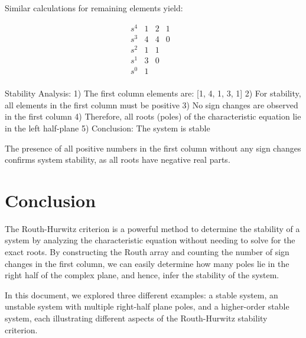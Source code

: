 \documentclass[a4paper,12pt]{article}
\begin{document}
Similar calculations for remaining elements yield:

$$
\begin{array}{c|cccc}
s^4 & 1 & 2 & 1 & \\
s^3 & 4 & 4 & 0 & \\
s^2 & 1 & 1 & & \\
s^1 & 3 & 0 & & \\
s^0 & 1 & & & \\
\end{array}
$$

Stability Analysis:
1) The first column elements are: [1, 4, 1, 3, 1]
2) For stability, all elements in the first column must be positive
3) No sign changes are observed in the first column
4) Therefore, all roots (poles) of the characteristic equation lie in the left half-plane
5) Conclusion: The system is stable

The presence of all positive numbers in the first column without any sign changes confirms system stability, as all roots have negative real parts.

\section{Conclusion}

The Routh-Hurwitz criterion is a powerful method to determine the stability of a system by analyzing the characteristic equation without needing to solve for the exact roots. By constructing the Routh array and counting the number of sign changes in the first column, we can easily determine how many poles lie in the right half of the complex plane, and hence, infer the stability of the system. 

In this document, we explored three different examples: a stable system, an unstable system with multiple right-half plane poles, and a higher-order stable system, each illustrating different aspects of the Routh-Hurwitz stability criterion.
\end{document}
